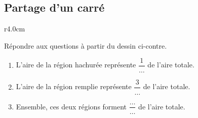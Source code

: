 
\subsection*{Partage d'un carré}

\begin{wrapfigure}[2]{r}{4.0cm}
   \vspace{-0.5cm}        %
   \centering
   
\end{wrapfigure}

Répondre aux questions à partir du dessin ci-contre.
\begin{enumerate}
    \item
                L'aire de la région hachurée représente \( \dfrac{ 1 }{ \ldots }\) de l'aire totale.
            \item
                L'aire de la région remplie représente \( \dfrac{ 3 }{ \ldots }\) de l'aire totale.
    \item
        Ensemble, ces deux régions forment \( \dfrac{ \ldots }{ \ldots }\) de l'aire totale.
\end{enumerate}
